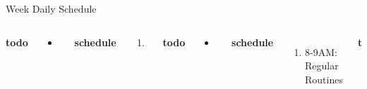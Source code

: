 \documentclass[serif, mathserif, final]{beamer}
\newcommand{\timeEst}[1]{\textit{Time:} \textit{#1}}
\newcommand{\priority}[1]{\textit{Priority:} \textit{#1}}
\newcommand{\deadline}[1]{#1}
\begin{document}
\begin{frame}{}
\begin{columns}
\begin{column}{0.50\linewidth}
\begin{block}{Week Daily Schedule}
\begin{columns}
          \textbf{\small todo} \\
          \begin{itemize}
            \tiny \item \tiny 
            
          \end{itemize}  
          \textbf{\small schedule}\\ 
          \begin{enumerate} 
            \tiny \item \tiny
          \end{enumerate} 
          
          \textbf{\small todo} \\
          \begin{itemize}
            \tiny \item \tiny 
          \end{itemize}
          \textbf{\small schedule} \\
          \begin{enumerate}
            \tiny \item \tiny 8-9AM: Regular Routines 
          \end{enumerate} 
          \textbf{\small todo}\\
          \begin{itemize} 
            \tiny \item \tiny Work:comm: confirm meeting. 
          \item \tiny worklife: integrate all of chapter 7 and 8. 
          \item \tiny worklife: happiness 
          \item \tiny Mgmt:Spaces: map out area 
          \item \tiny Mgmt:Spaces: check time 
          \end{itemize}
          \textbf{\small schedule}\\
          \begin{enumerate} 
            \tiny \item \tiny 8-9AM: Regular Routines 
          \end{enumerate} 
          
          \textbf{\small todo}\\ 
          \begin{itemize}
            \tiny \item \tiny -  \deadline{ }   \timeEst{} \priority{} 
          \end{itemize}
          \textbf{\small schedule}\\
          \begin{enumerate}


\end{enumerate}
\end{columns}
\end{block}
\end{column}
\end{columns}
\end{frame}
\end{document}
